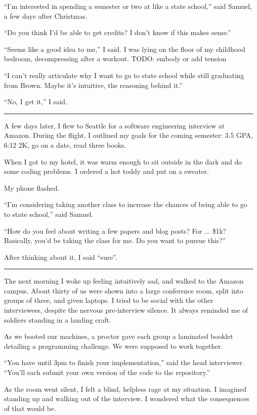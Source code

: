 ``I'm interested in spending a semester or two at like a state school,'' said
Samuel, a few days after Christmas.  

``Do you think I'd be able to get credits?  I don't know if this makes sense.''

``Seems like a good idea to me,'' I said.  I was lying on the floor of my
childhood bedroom, decompressing after a workout.  TODO: embody or add tension

``I can't really articulate why I want to go to state school while still
graduating from Brown.   Maybe it's intuitive, the reasoning behind it.'' 

``No, I get it,'' I said. 

\plainfancybreak{12pt}{2}{* * *}

A few days later, I flew to Seattle for a software engineering interview at
Amazon.  During the flight, I outlined my goals for the coming semester: 3.5 GPA,
6:12 2K, go on a date, read three books.

When I got to my hotel, it was warm enough to sit outside in the dark and do
some coding problems.  I ordered a hot toddy and put on a sweater.

My phone flashed.

``I'm considering taking another class to increase the chances of being able to
go to state school,'' said Samuel.  

``How do you feel about writing a few papers and blog posts?  For ... \$1k?
Basically, you'd be taking the class for me.  Do you want to pursue this?'' 

After thinking about it, I said ``sure''.

\plainfancybreak{12pt}{2}{* * *}

The next morning I woke up feeling intuitively sad, and walked to the Amazon
campus.  About thirty of us were shown into a large conference room, split into
groups of three, and given laptops.  I tried to be social with the other
interviewees, despite the nervous pre-interview silence.  It always reminded me
of soldiers standing in a landing craft.

As we booted our machines, a proctor gave each group a laminated booklet
detailing a programming challenge.  We were supposed to work together.

``You have until 3pm to finish your implementation,'' said the head interviewer.
``You'll each submit your own version of the code to the repository.''

As the room went silent, I felt a blind, helpless rage at my situation.  I
imagined standing up and walking out of the interview.  I wondered what the
consequences of that would be.  

